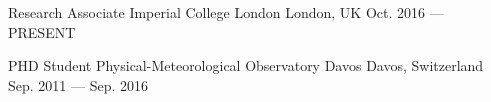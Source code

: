 

\begin{cventries}

  \cventry
    {Research Associate} %
    {Imperial College London} %
    {London, UK} %
    {Oct. 2016 --- PRESENT} %
    {
    }

  \cventry
    {PHD Student} %
    {Physical-Meteorological Observatory Davos} %
    {Davos, Switzerland} %
    {Sep. 2011 --- Sep. 2016} %
    {
    }


\end{cventries}
